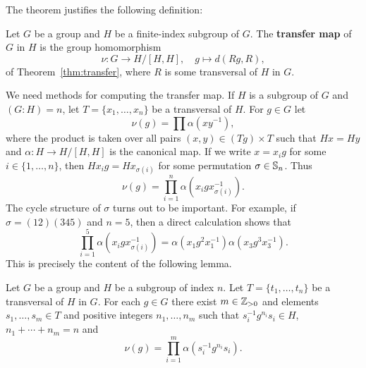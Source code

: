 The theorem justifies the following definition: 

\begin{definition}
	Let $G$ be a group and $H$ be a finite-index subgroup of $G$. The
	\textbf{transfer map} of $G$ in $H$ is the group homomorphism 
	\[
		\nu\colon G\to H/[H,H],
		\quad
		g\mapsto d(Rg,R),
	\]
	of Theorem~\ref{thm:transfer}, where $R$ is some transversal of $H$ in $G$.
\end{definition}

We need methods for computing the transfer map. If $H$ is a subgroup of 
$G$
and $(G:H)=n$, let $T=\{x_1,\dots,x_n\}$ be a transversal of $H$. For $g\in G$ let  
\[
	\nu(g)=\prod \alpha(xy^{-1}),
\]
where the product is taken over all pairs $(x,y)\in (Tg)\times T$ such that $Hx=Hy$
and $\alpha\colon H\to H/[H,H]$ is the canonical map. 
If we write 
$x=x_ig$ for some $i\in\{1,\dots,n\}$, then  
$Hx_ig=Hx_{\sigma(i)}$ for some permutation $\sigma\in\mathbb{S}_n$. Thus 
\[
	\nu(g)=\prod_{i=1}^n\alpha(x_igx_{\sigma(i)}^{-1}).
\]
The cycle structure of $\sigma$ turns out to be important. 
For example, if $\sigma=(12)(345)$ and $n=5$, then a direct calculation shows that 
\[
\prod_{i=1}^5\alpha\left(x_igx_{\sigma(i)}^{-1}\right)
=\alpha(x_1g^2x_1^{-1})\alpha(x_3g^3x_3^{-1}).
\]
This is precisely the content of the following lemma. 




\begin{lemma}
	\label{lem:transfer}
	Let $G$ be a group and $H$ be a subgroup of index $n$. Let 
	$T=\{t_1,\dots,t_n\}$ be a transversal of $H$ in $G$.  For each $g\in G$ there exist 
	$m\in\mathbb{Z}_{>0}$ and elements 
	$s_{1},\dots,s_{m}\in T$ and positive integers $n_1,\dots,n_m$
    such that 
	$s_i^{-1}g^{n_i}s_i\in H$,
	$n_1+\cdots+n_m=n$ and 
	\[
		\nu(g)=\prod_{i=1}^m \alpha(s_i^{-1}g^{n_i}s_i).
	\]
\end{lemma}


